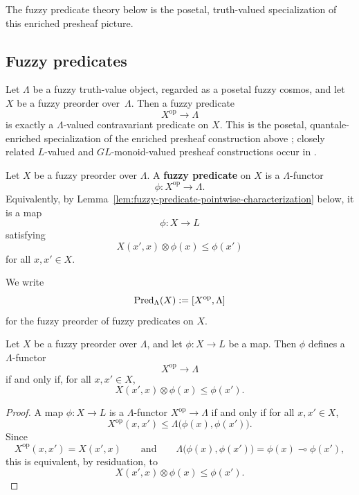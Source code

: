 The fuzzy predicate theory below is the posetal, truth-valued specialization of this enriched presheaf picture.

\subsection{Fuzzy predicates}
\label{subsec:fuzzy-predicates}

Let \(\Lambda\) be a fuzzy truth-value object, regarded as a posetal fuzzy cosmos, and let \(X\) be a fuzzy preorder over~\(\Lambda\). Then a fuzzy predicate
\[
    X^{\mathrm{op}}\to \Lambda
\]
is exactly a \(\Lambda\)-valued contravariant predicate on \(X\). This is the posetal, quantale-enriched specialization of the enriched presheaf construction above \cite[Definition~2.2]{stubbe-2014-quantaloid-enriched}; closely related \(L\)-valued and \(GL\)-monoid-valued presheaf constructions occur in \cite{Hohle1995PresheavesGLMonoids,Hohle1998GLQuantales,HohleKubiak2011QuantaleSets}.

\begin{definition}
\label{def:fuzzy-predicate}
    Let \(X\) be a fuzzy preorder over \(\Lambda\). A \textbf{fuzzy predicate} on \(X\) is a \(\Lambda\)-functor
    \[
        \phi:X^{\mathrm{op}}\to \Lambda.
    \]
    Equivalently, by Lemma~\ref{lem:fuzzy-predicate-pointwise-characterization} below, it is a map
    \[
        \phi:X\to L
    \]
    satisfying
    \begin{equation}
    \label{eq:fuzzy-predicate-law}
        X(x',x)\otimes \phi(x)\leq \phi(x')
    \end{equation}
    for all \(x,x'\in X\).

    We write
    \[
        \mathrm{Pred}_\Lambda(X):=[X^{\mathrm{op}},\Lambda]
    \]
    for the fuzzy preorder of fuzzy predicates on \(X\).
\end{definition}

\begin{lemma}
\label{lem:fuzzy-predicate-pointwise-characterization}
    Let \(X\) be a fuzzy preorder over \(\Lambda\), and let \(\phi:X\to L\) be a map. Then \(\phi\) defines a \(\Lambda\)-functor
    \[
        X^{\mathrm{op}}\to \Lambda
    \]
    if and only if, for all \(x,x'\in X\),
    \[
        X(x',x)\otimes \phi(x)\leq \phi(x').
    \]
\end{lemma}

\begin{proof}
    A map \(\phi:X\to L\) is a \(\Lambda\)-functor \(X^{\mathrm{op}}\to \Lambda\) if and only if for all \(x,x'\in X\),
    \[
        X^{\mathrm{op}}(x,x')
        \leq
        \Lambda\bigl(\phi(x),\phi(x')\bigr).
    \]
    Since
    \[
        X^{\mathrm{op}}(x,x')=X(x',x)
        \qquad\text{and}\qquad
        \Lambda\bigl(\phi(x),\phi(x')\bigr)
        =
        \phi(x)\multimap \phi(x'),
    \]
    this is equivalent, by residuation, to
    \[
        X(x',x)\otimes \phi(x)\leq \phi(x').
    \]
\end{proof}

